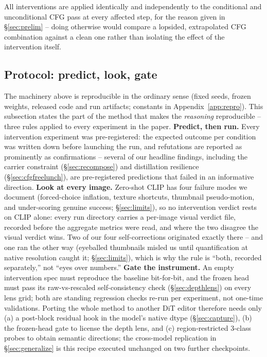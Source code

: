 \documentclass[10pt,twocolumn,letterpaper]{article}
\begin{document}
All interventions are applied identically and independently to the
conditional and unconditional CFG pass at every affected step, for the
reason given in \S\ref{sec:prelim} -- doing otherwise would compare a
lopsided, extrapolated CFG combination against a clean one rather than
isolating the effect of the intervention itself.

\subsection{Protocol: predict, look, gate}\label{sec:protocol}
The machinery above is reproducible in the ordinary sense (fixed seeds,
frozen weights, released code and run artifacts; constants in
Appendix~\ref{app:repro}). This subsection states the part of the
method that makes the \emph{reasoning} reproducible -- three rules
applied to every experiment in the paper. \textbf{Predict, then run.}
Every intervention experiment was pre-registered: the expected outcome
per condition was written down before launching the run, and
refutations are reported as prominently as confirmations -- several of
our headline findings, including the carrier constraint
(\S\ref{sec:recompose}) and distillation resilience
(\S\ref{sec:cfgfreelunch}), are pre-registered predictions that failed
in an informative direction. \textbf{Look at every image.} Zero-shot
CLIP has four failure modes we document (forced-choice inflation,
texture shortcuts, thumbnail pseudo-motion, and under-scoring genuine
success; \S\ref{sec:limits}), so no intervention verdict rests on CLIP
alone: every run directory carries a per-image visual verdict file,
recorded before the aggregate metrics were read, and where the two
disagree the visual verdict wins. Two of our four self-corrections
originated exactly there -- and one ran the other way (eyeballed
thumbnails misled us until quantification at native resolution caught
it; \S\ref{sec:limits}), which is why the rule is ``both, recorded
separately,'' not ``eyes over numbers.'' \textbf{Gate the instrument.}
An empty intervention spec must reproduce the baseline bit-for-bit,
and the frozen head must pass its raw-vs-rescaled self-consistency
check (\S\ref{sec:depthlens}) on every lens grid; both are standing
regression checks re-run per experiment, not one-time validations.
Porting the whole method to another DiT editor therefore needs only
(a) a post-block residual hook in the model's native dtype
(\S\ref{sec:capture}), (b) the frozen-head gate to license the depth
 lens, and (c) region-restricted 3-class probes to obtain semantic
directions; the cross-model replication in \S\ref{sec:generalize} is
this recipe executed unchanged on two further checkpoints.
\end{document}
